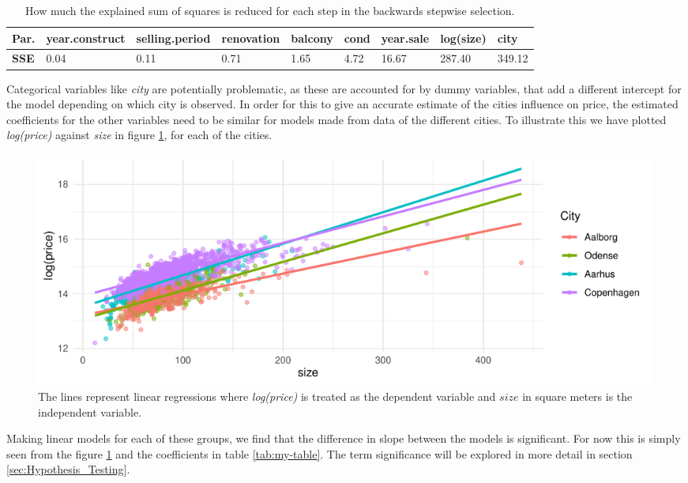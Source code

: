 \begin{table}[H] 
\begin{tabular}{@{}lllllllll@{}}
\toprule
\textbf{Par.} & year.construct & selling.period & renovation & balcony & cond & year.sale & log(size) & city   \\ \midrule
\textbf{SSE} & 0.04           & 0.11           & 0.71       & 1.65    &   4.72   & 16.67     & 287.40    & 349.12 \\ \bottomrule
\end{tabular}
\caption{How much the explained sum of squares is reduced for each step in the backwards stepwise selection.}
\label{tbl:Parameter_SSE}
\end{table}
\newpage
Categorical variables like \textit{city} are potentially problematic, as these are accounted for by dummy variables, that add a different intercept for the model depending on which city is observed.
In order for this to give an accurate estimate of the cities influence on price, the estimated coefficients for the other variables need to be similar for models made from data of the different cities. 
To illustrate this we have plotted \textit{log(price)} against \textit{size} in figure \ref{fig:Forskellig_haeldning}, for each of the cities.
\begin{figure}[H]
    \centering
    \includegraphics[width = 1\textwidth]{figures/Nanna/Forskellig_haelding.pdf}
    \caption{The lines represent linear regressions where \textit{log(price)} is treated as the dependent variable and $size$ in square meters is the independent variable.}
    \label{fig:Forskellig_haeldning}
\end{figure}
Making linear models for each of these groups, we find that the difference in slope between the models is significant.
For now this is simply seen from the figure \ref{fig:Forskellig_haeldning} and the coefficients in table \ref{tab:my-table}.
The term significance will be explored in more detail in section \ref{sec:Hypothesis_Testing}. 


